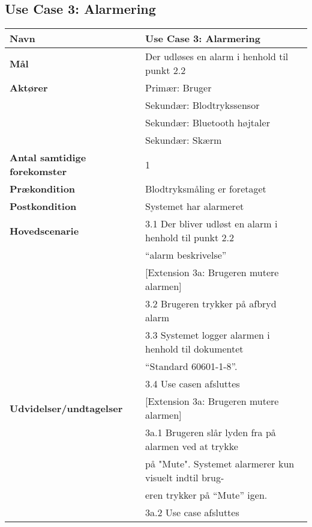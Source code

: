 \vspace{1 cm}
\subsection{Use Case 3: Alarmering}
\begin{table}[h!]
	\begin{tabular}{l|l}
		\rowcolor[HTML]{A9D9F9} 
		\textbf{Navn} & Use Case 3: Alarmering \\ \hline
		\textbf{Mål} & Der udløses en alarm i henhold til punkt 2.2 \\ \hline
		\textbf{Aktører} & Primær: Bruger \\
		\textbf{} & Sekundær: Blodtrykssensor \\
		\textbf{} & Sekundær: Bluetooth højtaler \\
		\textbf{} & Sekundær: Skærm \\ \hline
		\rowcolor[HTML]{A9D9F9} 
		\textbf{Antal samtidige forekomster} & 1 \\ \hline
		\textbf{Prækondition} & Blodtryksmåling er foretaget \\ \hline
		\rowcolor[HTML]{A9D9F9} 
		\textbf{Postkondition} & Systemet har alarmeret \\ \hline
		\textbf{Hovedscenarie} & 3.1 Der bliver udløst en alarm i henhold til punkt 2.2 \\
		\textbf{} & “alarm beskrivelse” \\
		\textbf{} & {[}Extension 3a: Brugeren mutere alarmen{]} \\
		\textbf{} & 3.2 Brugeren trykker på afbryd alarm \\
		\textbf{} & 3.3 Systemet logger alarmen i henhold til dokumentet \\
		\textbf{} & “Standard 60601-1-8”. \\
		\textbf{} & 3.4 Use casen afsluttes \\ \hline
		\rowcolor[HTML]{A9D9F9} 
		\textbf{Udvidelser/undtagelser} & {[}Extension 3a: Brugeren mutere alarmen{]} \\
		\rowcolor[HTML]{A9D9F9} 
		& 3a.1 Brugeren slår lyden fra på alarmen ved at trykke\\
		\rowcolor[HTML]{A9D9F9} 
		& på "Mute". Systemet alarmerer kun visuelt indtil brug- \\
		\rowcolor[HTML]{A9D9F9} 
		& eren trykker på “Mute” igen. \\
		\rowcolor[HTML]{A9D9F9} 
		& 3a.2 Use case afsluttes
	\end{tabular}
\end{table}